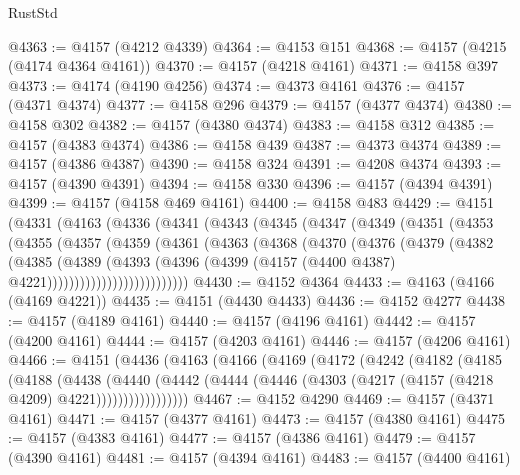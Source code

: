 \begin{lexlean}{RustStd}
\begin{coremodule}
@4363 := @4157 (@4212 @4339)
@4364 := @4153 @151
@4368 := @4157 (@4215 (@4174 @4364 @4161))
@4370 := @4157 (@4218 @4161)
@4371 := @4158 @397
@4373 := @4174 (@4190 @4256)
@4374 := @4373 @4161
@4376 := @4157 (@4371 @4374)
@4377 := @4158 @296
@4379 := @4157 (@4377 @4374)
@4380 := @4158 @302
@4382 := @4157 (@4380 @4374)
@4383 := @4158 @312
@4385 := @4157 (@4383 @4374)
@4386 := @4158 @439
@4387 := @4373 @4374
@4389 := @4157 (@4386 @4387)
@4390 := @4158 @324
@4391 := @4208 @4374
@4393 := @4157 (@4390 @4391)
@4394 := @4158 @330
@4396 := @4157 (@4394 @4391)
@4399 := @4157 (@4158 @469 @4161)
@4400 := @4158 @483
@4429 := @4151
    (@4331
      (@4163
        (@4336
          (@4341
            (@4343
              (@4345
                (@4347
                  (@4349
                    (@4351
                      (@4353
                        (@4355
                          (@4357
                            (@4359
                              (@4361
                                (@4363
                                  (@4368
                                    (@4370
                                      (@4376
                                        (@4379
                                          (@4382
                                            (@4385
                                              (@4389
                                                (@4393
                                                  (@4396
                                                    (@4399
                                                      (@4157
                                                        (@4400 @4387)
                                                        @4221))))))))))))))))))))))))))
@4430 := @4152 @4364
@4433 := @4163 (@4166 (@4169 @4221))
@4435 := @4151 (@4430 @4433)
@4436 := @4152 @4277
@4438 := @4157 (@4189 @4161)
@4440 := @4157 (@4196 @4161)
@4442 := @4157 (@4200 @4161)
@4444 := @4157 (@4203 @4161)
@4446 := @4157 (@4206 @4161)
@4466 := @4151
    (@4436
      (@4163
        (@4166
          (@4169
            (@4172
              (@4242
                (@4182
                  (@4185
                    (@4188
                      (@4438
                        (@4440
                          (@4442
                            (@4444 (@4446 (@4303 (@4217 (@4157 (@4218 @4209) @4221)))))))))))))))))
@4467 := @4152 @4290
@4469 := @4157 (@4371 @4161)
@4471 := @4157 (@4377 @4161)
@4473 := @4157 (@4380 @4161)
@4475 := @4157 (@4383 @4161)
@4477 := @4157 (@4386 @4161)
@4479 := @4157 (@4390 @4161)
@4481 := @4157 (@4394 @4161)
@4483 := @4157 (@4400 @4161)

\end{coremodule}
\end{lexlean}
